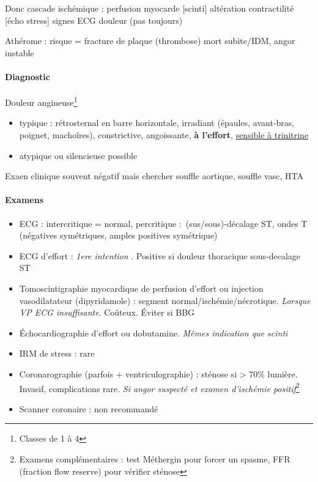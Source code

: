 \documentclass{article}
\begin{document}
Donc cascade ischémique : \dec perfusion myocarde [scinti] \thus altération
contractilité [écho stress] \thus signes ECG \thus douleur (pas toujours)

Athérome : risque = fracture de plaque \thus (thrombose) mort subite/IDM, angor
instable

\paragraph{Diagnostic}
Douleur angineuse\footnote{Classes de 1 à 4}
\begin{itemize}
  \item typique : rétrosternal en barre horizontale, irradiant (épaules,
    avant-bras, poignet, machoîres), constrictive, angoissante, \textbf{à
    l'effort}, \underline{sensible à trinitrine}
  \item atypique ou silencieuse possible
\end{itemize}
Exaen clinique souvent négatif mais chercher souffle aortique, souffle vasc, HTA

\paragraph{Examens}
\begin{itemize}
  \item ECG : intercritique = normal, percritique : (sus/sous)-décalage
    ST, ondes T (négatives symétriques, amples positives symétrique)
  \item ECG d'effort : \textit{1ere intention} . Positive si douleur thoracique \lor{}
    sous-decalage ST
  \item Tomoscintigraphie myocardique de perfusion d'effort ou injection
    vasodilatateur (dipyridamole) : segment normal/ischémie/nécrotique.
    \textit{Lorsque VP ECG insuffisante}. Coûteux. Éviter si \gls{BBG}
  \item Échocardiographie d'effort ou dobutamine. \textit{Mêmes indication que
    scinti} 
  \item IRM de stress : rare
  \item Coronarographie (parfois + ventriculographie) : sténose si > 70\%
    lumière. Invasif, complications rare. \textit{Si angor suspecté et examen
    d'ischémie positif}\footnote{Examens complémentaires : test Méthergin pour
      forcer un spasme, FFR (fraction flow reserve) pour vérifier sténose}
  \item Scanner coronaire : non recommandé
\end{itemize}
\end{document}
